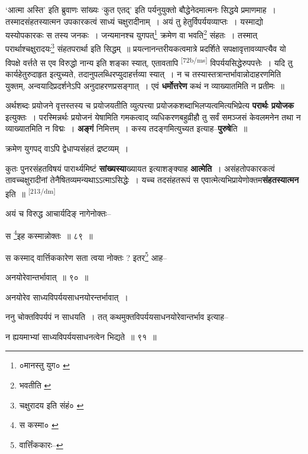 \documentclass[article,12pt,a4paper]{memoir}
\begin{document}
	‘आत्मा अस्ति’ इति ब्रुवाणः सांख्यः ‘कुत एतद्’ इति पर्यनुयुक्तो बौद्धेनेदमात्मनः सिद्धये प्रमाणमाह । तस्मादसंहतस्यात्मन उपकारकत्वं साध्यं चक्षुरादीनाम् । अयं तु हेतुर्विपर्ययव्याप्तः । यस्माद्यो यस्योपकारकः स तस्य जनकः । जन्यमानश्च युगपत्\footnote{०मानस्तु युग० \cite{dp-msD}} क्रमेण वा भवति\footnote{भवतीति \cite{dp-msD}} संहतः । तस्मात् परार्थाश्चक्षुरादयः\footnote{चक्षुरादय इति संहं० \cite{dp-msA} \cite{dp-msB} \cite{dp-edP} \cite{dp-edH} \cite{dp-edN}} संहतपरार्था इति सिद्धम् ॥ प्रयत्नानन्तरीयकत्वमात्रे प्रदर्शिते सपक्षावृत्तावव्याप्त्यैव यो विपक्षे वर्त्तते स एव विरुद्धो नान्य इति शङ्का स्यात्, एतावतापि \leavevmode\textsuperscript{\rmlatinfont\tiny [72b/ms]} विपर्ययसिद्धेरुपपत्तेः । यदि तु कार्यहेतुरुदाहृत इत्युच्यते, तदानुपलब्धिरप्युदाहर्त्तव्या स्यात् । न च तस्यास्तत्रान्तर्भावान्नोदाहरणमिति युक्तम्, अन्वयादिप्रदर्शनेऽपि अनुदाहरणप्रसङ्गात् । एवं \textbf{धर्मोत्तरेण} कथं न व्याख्यातमिति न प्रतीमः ॥
	\pend
      

	  \pstart अर्थशब्दः प्रयोजने वृत्तस्तस्य च प्रयोजयतीति व्युत्पत्त्या प्रयोजकशब्दाभिलप्यत्वमित्यभिप्रेत्य \textbf{परार्थः प्रयोजक} इत्युक्तः । परस्मिन्नर्थः प्रयोजनं येषामिति गमकत्वाद् व्यधिकरणबहुव्रीहौ तु सर्वं समञ्जसं केवलमनेन तथा न व्याख्यातमिति न विद्मः । \textbf{अङ्गं} निमित्तम् । कस्य तदङ्गमित्युच्यत इत्याह--\textbf{पुरुषे}ति ॥
	\pend
      

	  \pstart क्रमेण युगपद् वाऽपि द्वेधाप्यसंहतं द्रष्टव्यम् ।
	\pend
      

	  \pstart कुतः पुनरसंहतविषयं पारार्थ्यमिष्टं \textbf{सांख्यस्या}ख्यायत इत्याशङ्क्याह \textbf{आत्मेति} । असंहतोपकारकत्वं तावच्चक्षुरादीनां तेनैषितव्यमन्यथाऽऽत्माऽसिद्धेः । यच्च तदसंहतरूपं स एवात्मेत्यभिप्रायेणोक्तम\textbf{संहतस्यात्मन} इति ॥
	\pend
      \leavevmode\textsuperscript{\rmlatinfont\tiny [213/dm]}

	  \pstart अयं च विरुद्ध आचार्यदिङ् नागेनोक्तः--
	\pend
       

	  \pstart स \footnote{स कस्मा० \cite{dp-msC}}इह कस्मान्नोक्तः ॥ ८९ ॥
	\pend
       

	  \pstart स कस्माद् वार्त्तिककारेण सता त्वया नोक्तः ? इतर\footnote{वार्त्तिंककारः--\cite{dp-msD-n}} आह--
	\pend
       

	  \pstart अनयोरेवान्तर्भावात् ॥ ९० ॥
	\pend
       

	  \pstart अनयोरेव साध्यविपर्ययसाधनयोरन्तर्भावात् ।
	\pend
       

	  \pstart ननु चोक्तविपर्यपं न साधयति । तत् कथमुक्तविपर्ययसाधनयोरेवान्तर्भाव इत्याह--
	\pend
       

	  \pstart न ह्ययमाभ्यां साध्यविपर्ययसाधनत्वेन भिद्यते ॥ ९१ ॥
	\pend
       
\end{document}
